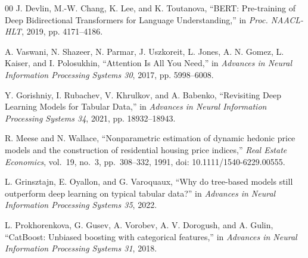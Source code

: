 \begin{thebibliography}{00}
J. Devlin, M.-W. Chang, K. Lee, and K. Toutanova, ``BERT: Pre-training of
Deep Bidirectional Transformers for Language Understanding,'' in
\emph{Proc. NAACL-HLT}, 2019, pp. 4171--4186.

A. Vaswani, N. Shazeer, N. Parmar, J. Uszkoreit, L. Jones, A. N. Gomez,
L. Kaiser, and I. Polosukhin, ``Attention Is All You Need,'' in
\emph{Advances in Neural Information Processing Systems 30}, 2017,
pp. 5998--6008.

Y. Gorishniy, I. Rubachev, V. Khrulkov, and A. Babenko, ``Revisiting Deep
Learning Models for Tabular Data,'' in \emph{Advances in Neural Information
Processing Systems 34}, 2021, pp. 18932--18943.

R. Meese and N. Wallace, ``Nonparametric estimation of dynamic hedonic price
models and the construction of residential housing price indices,''
\emph{Real Estate Economics}, vol.~19, no.~3, pp.~308--332, 1991,
doi: 10.1111/1540-6229.00555.

L. Grinsztajn, E. Oyallon, and G. Varoquaux, ``Why do tree-based models still
outperform deep learning on typical tabular data?'' in \emph{Advances in
Neural Information Processing Systems 35}, 2022.

L. Prokhorenkova, G. Gusev, A. Vorobev, A. V. Dorogush, and A. Gulin,
``CatBoost: Unbiased boosting with categorical features,'' in \emph{Advances
in Neural Information Processing Systems 31}, 2018.


\end{thebibliography}
